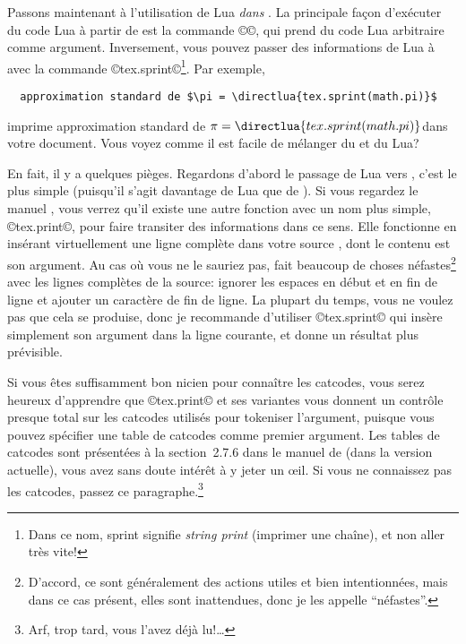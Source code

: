 \documentclass{lltxdoc}
\begin{document}
\medskip

Passons maintenant à l'utilisation de Lua \emph{dans} \luatex. La principale
façon d'exécuter du code Lua à partir de \tex est la commande ©\directlua©,
qui prend du code Lua arbitraire comme argument. Inversement, vous pouvez
passer des informations de Lua à \tex avec la commande ©tex.sprint©\footnote{Dans
  ce nom, \og{}sprint\gf{} signifie \og{}\emph{string print}\fg{}
  (\og{}imprimer une chaîne\fg{}), et non \og{}aller très vite\fg{}!}.
Par exemple,
\begin{Verbatim}
  approximation standard de $\pi = \directlua{tex.sprint(math.pi)}$
\end{Verbatim}
imprime \og{}approximation standard de $\pi = \directlua{tex.sprint(math.pi)}$\fg dans votre document. Vous voyez comme il est facile de mélanger du \tex et du Lua?

En fait, il y a quelques pièges. Regardons d'abord le passage de Lua vers \tex,
c'est le plus simple (puisqu'il s'agit davantage de Lua que de \tex).
Si vous regardez le manuel \luatex, vous verrez qu'il existe une autre fonction
avec un nom plus simple, ©tex.print©, pour faire transiter des informations
dans ce sens. Elle fonctionne en insérant virtuellement une ligne complète
dans votre source \tex, dont le contenu est son argument. Au cas où vous ne
le sauriez pas, \tex fait beaucoup de choses néfastes\footnote{D'accord, ce
  sont généralement des actions utiles et bien intentionnées, mais dans ce
  cas présent, elles sont inattendues, donc je les appelle ``néfastes''.} avec
les lignes complètes de la source: ignorer les espaces en début et en fin
de ligne et ajouter un caractère de fin de ligne. La plupart du temps, vous
ne voulez pas que cela se produise, donc je recommande d'utiliser ©tex.sprint©
qui insère simplement son argument dans la ligne courante, et donne un résultat
plus prévisible.

Si vous êtes suffisamment bon \tex{}nicien pour connaître les catcodes,
vous serez heureux d'apprendre que ©tex.print© et ses variantes vous donnent
un contrôle presque total sur les catcodes utilisés pour tokeniser l'argument,
puisque vous pouvez spécifier une table de catcodes comme premier argument.
Les tables de catcodes sont présentées à la section~2.7.6 dans le manuel de
\luatex (dans la version actuelle), vous avez sans doute intérêt à y jeter
un \oe il. Si vous ne connaissez pas les catcodes, passez ce
paragraphe.\footnote{Arf, trop tard, vous l'avez déjà lu!\dots}

\medskip
\end{document}
